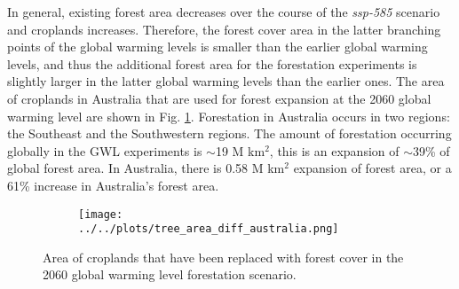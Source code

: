 \documentclass[]{article}
\begin{document}

In general, existing forest area decreases over the course of the \textit{ssp-585} scenario and croplands increases.
Therefore, the forest cover area in the latter branching points of the global warming levels is smaller than the earlier global warming levels, and thus the additional forest area for the forestation experiments is slightly larger in the latter global warming levels than the earlier ones.
The area of croplands in Australia that are used for forest expansion at the 2060 global warming level are shown in Fig. \ref{fig:to_forest}.
Forestation in Australia occurs in two regions: the Southeast and the Southwestern regions.
The amount of forestation occurring globally in the GWL experiments is $\sim$19 M km$^2$, this is an expansion of $\sim$39\% of global forest area.
In Australia, there is 0.58 M km$^2$ expansion of forest area, or a 61\% increase in Australia's forest area.

\begin{figure}[H]
    \begin{subfigure}[b]{\linewidth}
        \centering
        \texttt{[image: ../../plots/tree\_area\_diff\_australia.png]}
    \end{subfigure}
    \caption{Area of croplands that have been replaced with forest cover in the 2060 global warming level forestation scenario.}
    \label{fig:to_forest}
\end{figure}
\end{document}
